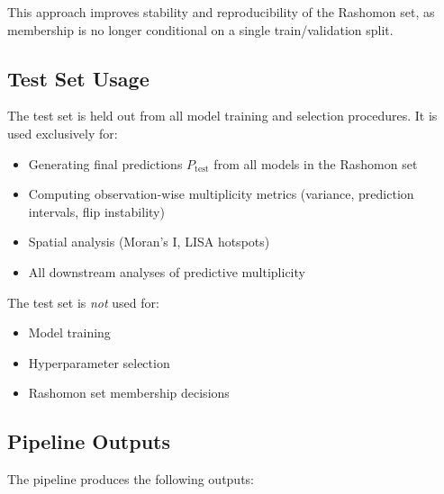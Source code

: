 This approach improves stability and reproducibility of the Rashomon set, as membership is no longer conditional on a single train/validation split.

\subsection{Test Set Usage}

The test set is held out from all model training and selection procedures. It is used exclusively for:
\begin{itemize}
    \item Generating final predictions $P_{\text{test}}$ from all models in the Rashomon set
    \item Computing observation-wise multiplicity metrics (variance, prediction intervals, flip instability)
    \item Spatial analysis (Moran's I, LISA hotspots)
    \item All downstream analyses of predictive multiplicity
\end{itemize}

The test set is \emph{not} used for:
\begin{itemize}
    \item Model training
    \item Hyperparameter selection
    \item Rashomon set membership decisions
\end{itemize}

\subsection{Pipeline Outputs}

The pipeline produces the following outputs:

